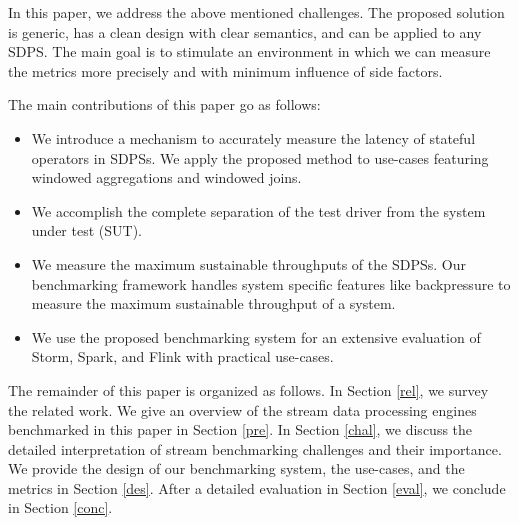 In this paper, we address the above mentioned challenges. The proposed solution is generic, has a clean design with clear semantics, and can be applied to any SDPS. The main goal is to stimulate an environment in which we can measure the metrics more precisely and with minimum influence of side factors.

The main contributions of this paper go as follows:
\begin{itemize}  
\item We    introduce a mechanism to accurately measure the latency of stateful operators in SDPSs. We apply the proposed method to use-cases featuring windowed aggregations and windowed joins. 
\item We accomplish the complete separation of the test driver from the system under test (SUT). 
\item We measure the maximum sustainable throughputs of the SDPSs. Our benchmarking framework handles system specific features like backpressure to measure the maximum sustainable throughput of a system. 
\item We use the proposed benchmarking system for an extensive evaluation of Storm, Spark, and Flink with practical use-cases.
\end{itemize}

The remainder of this paper is organized as follows. In Section \ref{rel}, we survey the related work. We give an overview of the stream data processing engines benchmarked in this paper in Section \ref{pre}. In Section \ref{chal}, we discuss the detailed interpretation of stream benchmarking challenges and their importance. We provide the design of our benchmarking system, the use-cases, and the metrics in Section \ref{des}. After a detailed evaluation in Section \ref{eval}, we conclude in Section \ref{conc}.
